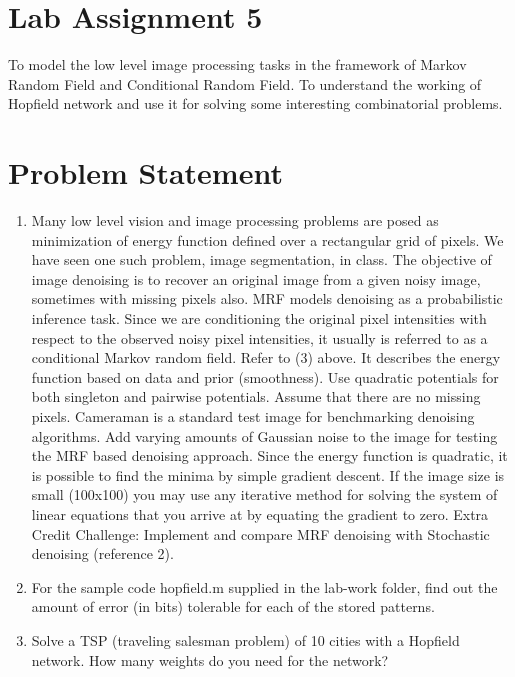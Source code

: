 \documentclass[conference]{IEEEtran}
\begin{document}

\section{Lab Assignment 5}
 To model the low level image processing tasks in the framework of Markov Random Field and Conditional Random Field. To understand the working of Hopfield network and use it for solving some interesting combinatorial problems.


\section{Problem Statement}

\begin{enumerate}
\item Many low level vision and image processing problems are posed as minimization of energy function defined over a rectangular grid of pixels. We have seen one such problem, image segmentation, in class. The objective of image denoising is to recover an original image from a given noisy image, sometimes with missing pixels also. MRF models denoising as a probabilistic inference task. Since we are conditioning the original pixel intensities with respect to the observed noisy pixel intensities, it usually is referred to as a conditional Markov random field.  Refer to (3) above. It describes the energy function based on data and prior (smoothness). Use quadratic potentials for both singleton and pairwise potentials. Assume that there are no missing pixels. Cameraman is a standard test image for benchmarking denoising algorithms. Add varying amounts of Gaussian noise to the image for testing the MRF based denoising approach. Since the energy function is quadratic, it is possible to find the minima by simple gradient descent. If the image size is small (100x100) you may use any iterative method for solving the system of linear equations that you arrive at  by equating the gradient to zero. Extra Credit Challenge: Implement and compare MRF denoising with Stochastic denoising (reference 2).


\item For the sample code hopfield.m supplied in the lab-work folder, find out the amount of error (in bits) tolerable for each of the stored patterns.


\item Solve a TSP (traveling salesman problem) of 10 cities with a Hopfield network.  How many weights do you need for the network?  


\end{enumerate}
\end{document}

